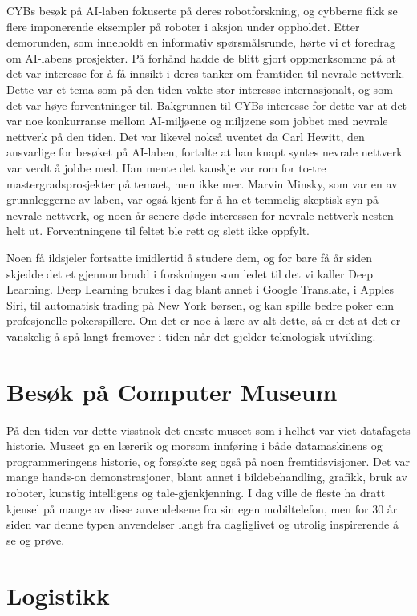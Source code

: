 CYBs besøk på AI-laben fokuserte på deres robotforskning, og cybberne fikk se flere imponerende eksempler på roboter i aksjon under oppholdet. Etter demorunden, som inneholdt en informativ spørsmålsrunde, hørte vi et foredrag om AI-labens prosjekter. På forhånd hadde de blitt gjort oppmerksomme på at det var interesse for å få innsikt i deres tanker om framtiden til nevrale nettverk. Dette var et tema som på den tiden vakte stor interesse internasjonalt, og som det var høye forventninger til. Bakgrunnen til CYBs interesse for dette var at det var noe konkurranse mellom AI-miljøene og miljøene som jobbet med nevrale nettverk på den tiden. Det var likevel nokså uventet da Carl Hewitt, den ansvarlige for besøket på AI-laben, fortalte at han knapt syntes nevrale nettverk var verdt å jobbe med. Han mente det kanskje var rom for to-tre mastergradsprosjekter på temaet, men ikke mer. Marvin Minsky, som var en av grunnleggerne av laben, var også kjent for å ha et temmelig skeptisk syn på nevrale nettverk, og noen år senere døde interessen for nevrale nettverk nesten helt ut. Forventningene til feltet ble rett og slett ikke oppfylt. 

Noen få ildsjeler fortsatte imidlertid å studere dem, og for bare få år siden skjedde det et gjennombrudd i forskningen som ledet til det vi kaller Deep Learning. Deep Learning brukes i dag blant annet i Google Translate, i Apples Siri, til automatisk trading på New York børsen, og kan spille bedre poker enn profesjonelle pokerspillere. Om det er noe å lære av alt dette, så er det at det er vanskelig å spå langt fremover i tiden når det gjelder teknologisk utvikling. 

\section{Besøk på Computer Museum}

På den tiden var dette visstnok det eneste museet som i helhet var viet datafagets historie. Museet ga en lærerik og morsom innføring i både datamaskinens og programmeringens historie, og forsøkte seg også på noen fremtidsvisjoner. Det var mange hands-on demonstrasjoner, blant annet i bildebehandling, grafikk, bruk av roboter, kunstig intelligens og tale-gjenkjenning. I dag ville de fleste ha dratt kjensel på mange av disse anvendelsene fra sin egen mobiltelefon, men for 30 år siden var denne typen anvendelser langt fra dagliglivet og utrolig inspirerende å se og prøve. 

\section{Logistikk}

